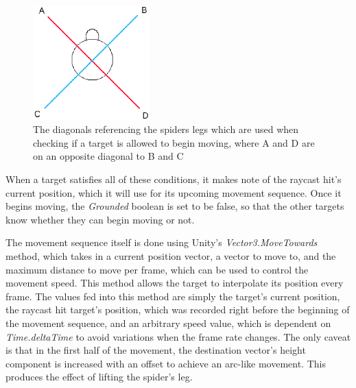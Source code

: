 \begin{figure}[tp]
    \centering
    \captionsetup{justification=centering}
    \includegraphics[width=0.4\textwidth]{grafika/diagonals2.eps}
    \caption{The diagonals referencing the spiders legs which are used when
    checking if a target is allowed to begin moving, where A and D are on an
opposite diagonal to B and C}
    \label{fig:diagonals}
\end{figure}

When a target satisfies all of these conditions, it makes note of the raycast
hit's current position, which it will use for its upcoming movement sequence.
Once it begins moving, the \textit{Grounded} boolean is set to be false, so that
the other targets know whether they can begin moving or not.

The movement sequence itself is done using Unity's \textit{Vector3.MoveTowards}
method, which takes in a current position vector, a vector to move to, and the
maximum distance to move per frame, which can be used to control the movement
speed. This method allows the target to interpolate its position every frame.
The values fed into this method are simply the target's current position, the
raycast hit target's position, which was recorded right before the beginning of
the movement sequence, and an arbitrary speed value, which is dependent on
\textit{Time.deltaTime} to avoid variations when the frame rate changes. The
only caveat is that in the first half of the movement, the destination vector's
height component is increased with an offset to achieve an arc-like movement.
This produces the effect of lifting the spider's leg.

